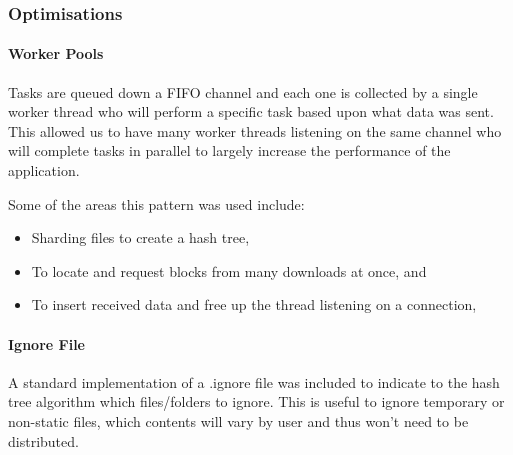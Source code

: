 
\subsubsection{Optimisations}

\paragraph*{Worker Pools}
Tasks are queued down a FIFO channel and each one is collected by a single worker thread who will perform a specific task based upon what data was sent. This allowed us to have many worker threads listening on the same channel who will complete tasks in parallel to largely increase the performance of the application.

\vspace{2mm}\noindent
Some of the areas this pattern was used include:

\begin{itemize}
  \item Sharding files to create a hash tree,
  \item To locate and request blocks from many downloads at once, and
  \item To insert received data and free up the thread listening on a connection,
\end{itemize}

\paragraph*{Ignore File} A standard implementation of a .ignore file was included to indicate to the hash tree algorithm which files/folders to ignore. This is useful to ignore temporary or non-static files, which contents will vary by user and thus won't need to be distributed.